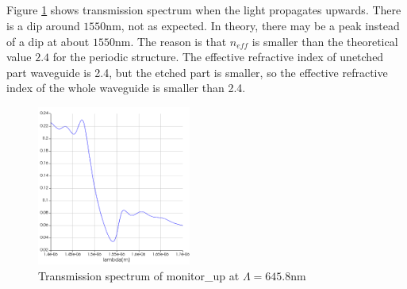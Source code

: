 \documentclass[fontsize=11pt]{scrartcl}
\begin{document}
\subsection{}
Figure \ref{fig3.2} shows transmission spectrum when the light propagates upwards. 
There is a dip around $1550\mathrm{nm}$, not as expected. 
In theory, there may be a peak instead of a dip at about $1550\mathrm{nm}$. 
The reason is that $n_{eff}$ is smaller than the theoretical value $2.4$ 
for the periodic structure. 
The effective refractive index of unetched part waveguide is 2.4, 
but the etched part is smaller, 
so the effective refractive index of the whole waveguide is smaller than 2.4.
\begin{figure}[H]
    \centering
     \includegraphics[width=0.45\textwidth]{img/fig3.2.png}
     \caption{Transmission spectrum of monitor\_up at $\Lambda=645.8\mathrm{nm}$}
     \label{fig3.2}
\end{figure}
\end{document}
